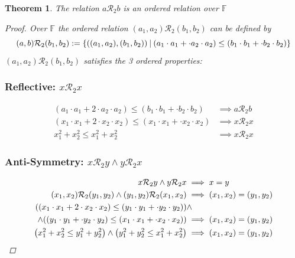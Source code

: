 \documentclass[]{article}
\newcommand{\Rel}{\mathcal{R}}
\newcommand{\st}{ \ \vline \ }
\newtheorem{theorem}{Theorem}
\begin{document}
\begin{theorem}
    The relation $a \Rel_2 b$ is an ordered relation over $\mathbb{F}$
    \begin{proof}
        Over $\mathbb{F}$ the ordered relation $(a_1,a_2) \Rel_2 (b_1,b_2)$ can be defined by 
        $$(a, b) \Rel_2 (b_1,b_2) 
            := \qty{((a_1,a_2),(b_1,b_2)) \st (a_1 \cdot a_1 + \cdot a_2 \cdot a_2) 
                \leq (b_1 \cdot b_1 + \cdot b_2 \cdot b_2)}
        $$
        $(a_1, a_2) \Rel_2 (b_1,b_2)$ satisfies the 3 ordered properties:
        \subsubsection{Reflective: $x \Rel_2 x$}
        \begin{align*}
            (a_1 \cdot a_1 + 2 \cdot a_2 \cdot a_2) 
                \leq (b_1 \cdot b_1 + \cdot b_2 \cdot b_2)
                &\implies a \Rel_2 b\\
            (x_1 \cdot x_1 + 2 \cdot x_2 \cdot x_2) 
                \leq (x_1 \cdot x_1 + \cdot x_2 \cdot x_2)
                &\implies x \Rel_2 x\\
            x_1^2 + x_2^2 \leq x_1^2 + x_2^2 &\implies x \Rel_2 x
        \end{align*}
        
        \subsubsection{Anti-Symmetry: $x \Rel_2 y \land y \Rel_2 x$}
        \begin{align*}
            x \Rel_2 y \land y \Rel_2 x &\implies x = y\\
            (x_1,x_2) \Rel_2 (y_1,y_2) \land (y_1,y_2) \Rel_2 (x_1,x_2) 
                &\implies (x_1,x_2)=(y_1,y_2)\\
            \qty((x_1 \cdot x_1 + 2 \cdot x_2 \cdot x_2)
                    \leq (y_1 \cdot y_1 + \cdot y_2 \cdot y_2))
            &\land\\
                \land \qty((y_1 \cdot y_1 + \cdot y_2 \cdot y_2)
                    \leq (x_1 \cdot x_1 + \cdot x_2 \cdot x_2))
                &\implies (x_1,x_2) = (y_1,y_2)\\
            \qty(x_1^2 + x_2^2 \leq y_1^2 + y_2^2)
                \land \qty(y_1^2 + y_2^2 \leq x_1^2 + x_2^2)
                &\implies (x_1,x_2) = (y_1,y_2)\\
        \end{align*}
        

\end{proof}
\end{theorem}
\end{document}
